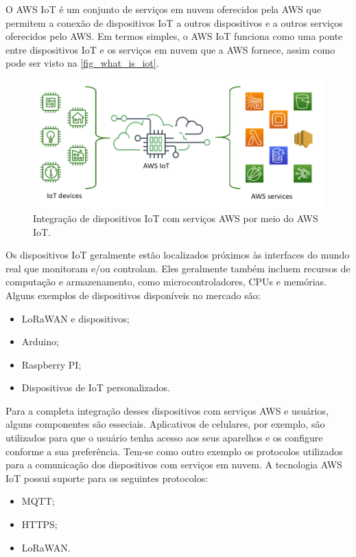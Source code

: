 \documentclass[
    12pt,
    openright,
    twoside,
    a4paper,
    english,
    spanish,
    brazil,
    ]{abntex2}
\begin{document}
O AWS IoT é um conjunto de serviços em nuvem oferecidos pela AWS que permitem a conexão de dispositivos IoT a outros dispositivos e a outros serviços oferecidos pelo AWS. Em termos simples, o AWS IoT funciona como uma ponte entre dispositivos IoT e os serviços em nuvem que a AWS fornece, assim como pode ser visto na \autoref{fig_what_is_iot}.

\begin{figure}[htb]
	\caption{Integração de dispositivos IoT com serviços AWS por meio do AWS IoT.}\label{fig_what_is_iot}
	\begin{center}
		\includegraphics[scale=0.5]{Images/what-is-aws-iot.png}
	\end{center}
\end{figure}

Os dispositivos IoT geralmente estão localizados próximos às interfaces do mundo real que monitoram e/ou controlam. Eles geralmente também incluem recursos de computação e armazenamento, como microcontroladores, CPUs e memórias. Alguns exemplos de dispositivos disponíveis no mercado são:
\begin{itemize}
	\item LoRaWAN e dispositivos;
	\item Arduino;
	\item Raspberry PI;
	\item Dispositivos de IoT personalizados.
\end{itemize}

Para a completa integração desses dispositivos com serviços AWS e usuários, alguns componentes são esseciais. Aplicativos de celulares, por exemplo, são utilizados para que o usuário tenha acesso aos seus aparelhos e os configure conforme a sua preferência. Tem-se como outro exemplo os protocolos utilizados para a comunicação dos dispositivos com serviços em nuvem. A tecnologia AWS IoT possui suporte para os seguintes protocolos:
\begin{itemize}
	\item MQTT;
	\item HTTPS;
	\item LoRaWAN.
\end{itemize}
\end{document}

